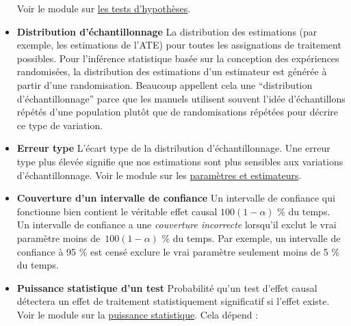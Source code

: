 \documentclass[
  12pt,
]{book}
\begin{document}
\begin{itemize}
  Voir le module sur \href{tests-dhypothèses.html}{les tests d'hypothèses}.
\item
  \textbf{Distribution d'échantillonnage} La distribution des estimations (par exemple, les estimations de l'ATE) pour toutes les assignations de traitement possibles.
  Pour l'inférence statistique basée sur la conception des expériences randomisées, la distribution des estimations d'un estimateur est générée à partir d'une randomisation.
  Beaucoup appellent cela une ``distribution d'échantillonnage'' parce que les manuels utilisent souvent l'idée d'échantillons répétés d'une population plutôt que de randomisations répétées pour décrire ce type de variation.
\item
  \textbf{Erreur type} L'écart type de la distribution d'échantillonnage. Une erreur type plus élevée signifie que nos estimations sont plus sensibles aux variations d'échantillonnage.
  Voir le module sur les \href{paramètres-et-estimateurs.html}{paramètres et estimateurs}.
\item
  \textbf{Couverture d'un intervalle de confiance} Un intervalle de confiance qui fonctionne bien contient le véritable effet causal \(100 ( 1 - \alpha)\) \% du temps.
  Un intervalle de confiance a une \emph{couverture incorrecte} lorsqu'il exclut le vrai paramètre moins de~\(100 (1 - \alpha)\) \% du temps.
  Par exemple, un intervalle de confiance à 95 \% est censé exclure le vrai paramètre seulement moins de 5 \% du temps.
\item
  \textbf{Puissance statistique d'un test} Probabilité qu'un test d'effet causal détectera un effet de traitement statistiquement significatif si l'effet existe.
  Voir le module sur la \href{puissance-statistique-et-diagnostics-de-conception.html}{puissance statistique}.
  Cela dépend :


\end{itemize}
\end{document}
